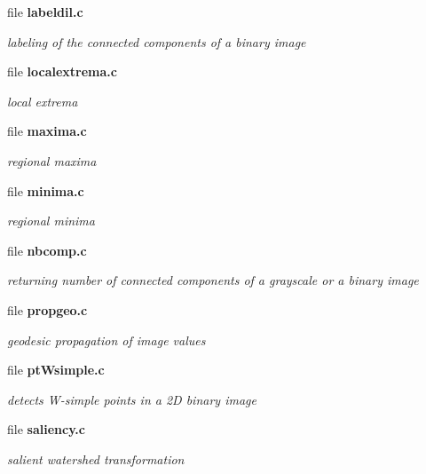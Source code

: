\begin{CompactItemize}
\item 
file \bf{labeldil.c}
\begin{CompactList}\small\item\em labeling of the connected components of a binary image \item\end{CompactList}

\item 
file \bf{localextrema.c}
\begin{CompactList}\small\item\em local extrema \item\end{CompactList}

\item 
file \bf{maxima.c}
\begin{CompactList}\small\item\em regional maxima \item\end{CompactList}

\item 
file \bf{minima.c}
\begin{CompactList}\small\item\em regional minima \item\end{CompactList}

\item 
file \bf{nbcomp.c}
\begin{CompactList}\small\item\em returning number of connected components of a grayscale or a binary image \item\end{CompactList}

\item 
file \bf{propgeo.c}
\begin{CompactList}\small\item\em geodesic propagation of image values \item\end{CompactList}

\item 
file \bf{pt\-Wsimple.c}
\begin{CompactList}\small\item\em detects W-simple points in a 2D binary image \item\end{CompactList}

\item 
file \bf{saliency.c}
\begin{CompactList}\small\item\em salient watershed transformation \item\end{CompactList}


\end{CompactItemize}
